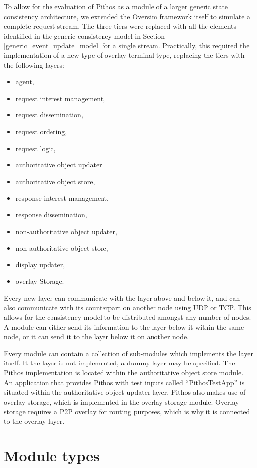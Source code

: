 To allow for the evaluation of Pithos as a module of a larger generic state consistency architecture, we extended the Oversim framework itself to simulate a complete request stream. The three tiers were replaced with all the elements identified in the generic consistency model in Section \ref{generic_event_update_model} for a single stream. Practically, this required the implementation of a new type of overlay terminal type, replacing the tiers with the following layers:
\begin{itemize}
\item agent,
\item request interest management,
\item request dissemination,
\item request ordering,
\item request logic,
\item authoritative object updater,
\item authoritative object store,
\item response interest management,
\item response dissemination,
\item non-authoritative object updater,
\item non-authoritative object store,
\item display updater,
\item overlay Storage.
\end{itemize}

Every new layer can communicate with the layer above and below it, and can also communicate with its counterpart on another node using UDP or TCP. This allows for the consistency model to be distributed amongst any number of nodes. A module can either send its information to the layer below it within the same node, or it can send it to the layer below it on another node.

Every module can contain a collection of sub-modules which implements the layer itself. It the layer is not implemented, a dummy layer may be specified. The Pithos implementation is located within the authoritative object store module. An application that provides Pithos with test inputs called ``PithosTestApp'' is situated within the authoritative object updater layer. Pithos also makes use of overlay storage, which is implemented in the overlay storage module. Overlay storage requires a P2P overlay for routing purposes, which is why it is connected to the overlay layer.

\section{Module types}
\label{pithos_module_types}

